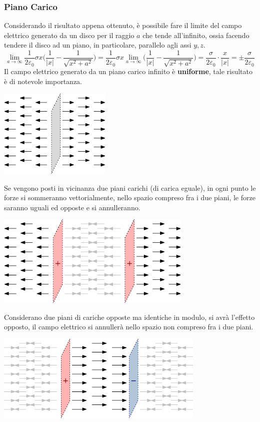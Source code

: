 \documentclass[10pt, letterpaper]{report}
\begin{document}
\subsubsection{Piano Carico}
Considerando il risultato appena ottenuto, è possibile fare il limite del campo elettrico generato da un disco per il raggio $a$ che tende all'infinito, ossia facendo tendere il disco ad un piano, in particolare, parallelo agli assi $y,z$.
$$ \lim_{a\rightarrow \infty}\frac{1}{2\varepsilon_0}\sigma x\Big( \frac{1}{|x|}-\frac{1}{\sqrt{x^2+a^2}} \Big)= 
\frac{1}{2\varepsilon_0}\sigma x\lim_{a\rightarrow \infty}\Big( \frac{1}{|x|}-\frac{1}{\sqrt{x^2+a^2}} \Big) =
\frac{\sigma}{2\varepsilon_0} \cdot \frac{x}{|x|}=\pm\frac{\sigma}{2\varepsilon_0}$$
Il campo elettrico generato da un piano carico infinito è \textbf{uniforme}, tale risultato è di notevole importanza.
\begin{center}
    \includegraphics[width=0.4\textwidth]{images/pianoCarico.eps}
\end{center}
Se vengono posti in vicinanza due piani carichi (di carica eguale), in ogni punto le forze si sommeranno vettorialmente, nello spazio compreso fra i due piani, le forze saranno uguali ed opposte e si annulleranno.
\begin{center}
    \includegraphics[width=0.7\textwidth]{images/pianoCarico2.eps}
\end{center}
Considerano due piani di cariche opposte ma identiche in modulo, si avrà l'effetto opposto, il campo elettrico si annullerà nello spazio non compreso fra i due piani.
\begin{center}
    \includegraphics[width=0.75\textwidth]{images/pianoCarico3.eps}
\end{center}
\end{document}
